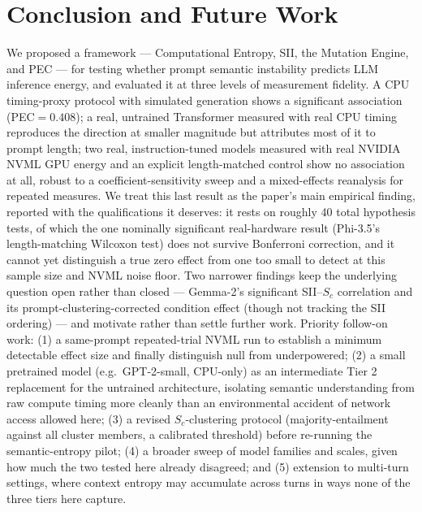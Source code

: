 \documentclass[conference]{IEEEtran}
\begin{document}
\section{Conclusion and Future Work}
\label{sec:conclusion}
We proposed a framework --- Computational Entropy, SII, the Mutation
Engine, and PEC --- for testing whether prompt semantic instability
predicts LLM inference energy, and evaluated it at three levels of
measurement fidelity. A CPU timing-proxy protocol with simulated
generation shows a significant association (PEC$=0.408$); a real,
untrained Transformer measured with real CPU timing reproduces the
direction at smaller magnitude but attributes most of it to prompt
length; two real, instruction-tuned models measured with real NVIDIA
NVML GPU energy and an explicit length-matched control show no
association at all, robust to a coefficient-sensitivity sweep and a
mixed-effects reanalysis for repeated measures. We treat this last
result as the paper's main empirical finding, reported with the
qualifications it deserves: it rests on roughly 40 total hypothesis
tests, of which the one nominally significant real-hardware result
(Phi-3.5's length-matching Wilcoxon test) does not survive Bonferroni
correction, and it cannot yet distinguish a true zero effect from one
too small to detect at this sample size and NVML noise floor. Two
narrower findings keep the underlying question open rather than closed
--- Gemma-2's significant SII--$S_c$ correlation and its
prompt-clustering-corrected condition effect (though not tracking the
SII ordering) --- and motivate rather than settle further work.
Priority follow-on work: (1) a same-prompt repeated-trial NVML run to
establish a minimum detectable effect size and finally distinguish
null from underpowered; (2) a small pretrained model (e.g.\ GPT-2-small,
CPU-only) as an intermediate Tier 2 replacement for the untrained
architecture, isolating semantic understanding from raw compute timing
more cleanly than an environmental accident of network access allowed
here; (3) a revised $S_c$-clustering protocol (majority-entailment
against all cluster members, a calibrated threshold) before
re-running the semantic-entropy pilot; (4) a broader sweep of model
families and scales, given how much the two tested here already
disagreed; and (5) extension to multi-turn settings, where context
entropy may accumulate across turns in ways none of the three tiers
here capture.
\end{document}
